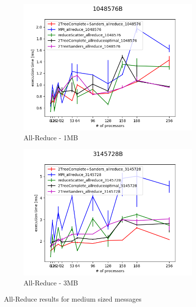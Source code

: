 \documentclass[sigplan,review,anonymous]{acmart}\settopmatter{printfolios=true,printccs=false,printacmref=false}
\begin{document}
\begin{figure}
\centering
\begin{subfigure}{.25\textwidth}
  \centering
  \includegraphics[width=1\linewidth]{images/Results/AllReduce/Allreduce_comp2_1048576B.png}
  \caption{All-Reduce - 1MB}
  \label{reduce-selected-1MB}
\end{subfigure}%
\begin{subfigure}{.25\textwidth}
  \centering
  \includegraphics[width=1\linewidth]{images/Results/AllReduce/Allreduce_comp2_3145728B.png}
  \caption{All-Reduce - 3MB}
  \label{reduce-selected-3MB}
\end{subfigure}
\caption{All-Reduce results for medium sized messages}
\label{graph-reduce-medium1-selected}
\end{figure}
\end{document}
